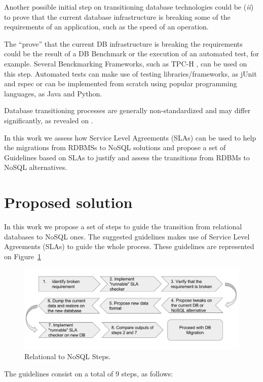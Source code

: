 Another possible initial step on transitioning database technologies could be (\textit{ii}) to prove that the current database infrastructure is breaking some of the requirements of an application, such as the speed of an operation. 

The ``prove'' that the current DB infrastructure is breaking the requirements could be the result of a DB Benchmark or the execution of an automated test, for example. Several Benckmarking Frameworks, such as TPC-H \cite{council2008tpc}, can be used on this step. Automated tests can make use of testing libraries/frameworks, as jUnit \cite{massol2003junit} and rspec \cite{chelimsky2010rspec} or can be implemented from scratch using popular programming languages, as Java and Python.

Database transitioning processes are generally non-standardized and may differ significantly, as revealed on \cite{fabioMartinSM}.  

In this work we assess how Service Level Agreements (SLAs) can be used to help the migrations from RDBMSs to NoSQL solutions and propose a set of Guidelines based on SLAs to justify and assess the transitions from RDBMs to NoSQL alternatives.

\section{Proposed solution}

In this work we propose a set of steps to guide the transition from relational databases to NoSQL ones. The suggested guidelines makes use of Service Level Agreements (SLAs) to guide the whole process. These guidelines are represented on Figure~\ref{fig:guidelinesNoSQL}


\begin{figure}[ht!]
\centering
\includegraphics[width=130mm]{guidelines.png}
\caption{Relational to NoSQL Steps.\label{fig:guidelinesNoSQL}}
\end{figure}

The guidelines consist on a total of 9 steps, as follows:


